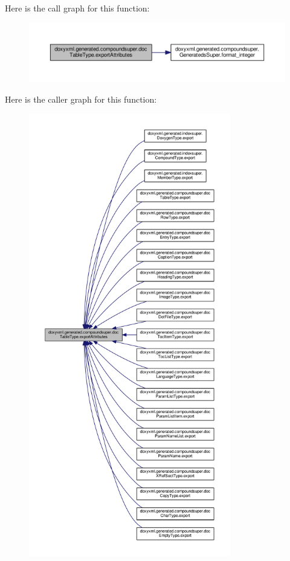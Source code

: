 Here is the call graph for this function\+:
\nopagebreak
\begin{figure}[H]
\begin{center}
\leavevmode
\includegraphics[width=350pt]{d9/d0e/classdoxyxml_1_1generated_1_1compoundsuper_1_1docTableType_a784ce34f9471f8147bf80126ed1519f3_cgraph}
\end{center}
\end{figure}




Here is the caller graph for this function\+:
\nopagebreak
\begin{figure}[H]
\begin{center}
\leavevmode
\includegraphics[height=550pt]{d9/d0e/classdoxyxml_1_1generated_1_1compoundsuper_1_1docTableType_a784ce34f9471f8147bf80126ed1519f3_icgraph}
\end{center}
\end{figure}


